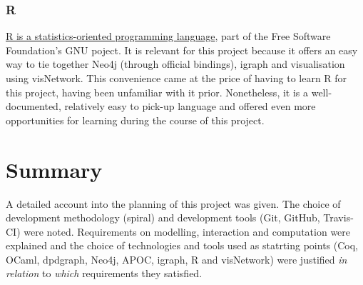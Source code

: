 \subsubsection{R}

\href{http://www.r-project.org}{R is a statistics-oriented programming language},
part of the Free Software Foundation's GNU poject. It is relevant for this
project because it offers an easy way to tie together Neo4j (through official
bindings), igraph and visualisation using visNetwork. This convenience came at
the price of having to learn R for this project, having been unfamiliar with it
prior. Nonetheless, it is a well-documented, relatively easy to pick-up language
and offered even more opportunities for learning during the course of this
project.

\section{Summary}

A detailed account into the planning of this project was given. The choice of
development methodology (spiral) and development tools (Git, GitHub, Travis-CI)
were noted. Requirements on modelling, interaction and computation were
explained and the choice of technologies and tools used as statrting points
(Coq, OCaml, dpdgraph, Neo4j, APOC, igraph, R and visNetwork) were justified
\emph{in relation} to \emph{which} requirements they satisfied.

